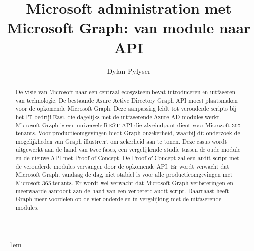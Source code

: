 \documentclass{hogent-article}
\title{Microsoft administration met Microsoft Graph: van module naar API}
\author{Dylan Pylyser}
\begin{document}
\begin{abstract} %
De visie van Microsoft naar een centraal ecosysteem bevat introduceren en uitfaseren van technologie. De bestaande Azure Active Directory Graph API moest plaatsmaken voor de opkomende Microsoft Graph. Deze aanpassing leidt tot verouderde scripts bij het IT-bedrijf Easi, die dagelijks met de uitfaserende Azure AD modules werkt. Microsoft Graph is een universele REST API die als eindpunt dient voor Microsoft 365 tenants. Voor productieomgevingen biedt Graph onzekerheid, waarbij dit onderzoek de mogelijkheden van Graph illustreert om zekerheid aan te tonen. Deze casus wordt uitgewerkt aan de hand van twee fases, een vergelijkende studie tussen de oude module en de nieuwe API met Proof-of-Concept. De Proof-of-Concept zal een audit-script met de verouderde modules vervangen door de opkomende API. Er wordt verwacht dat Microsoft Graph, vandaag de dag, niet stabiel is voor alle productieomgevingen met Microsoft 365 tenants. Er wordt wel verwacht dat Microsoft Graph verbeteringen en meerwaarde aantoont aan de hand van een verbeterd audit-script. Daarnaast heeft Graph meer voordelen op de vier onderdelen in vergelijking met de uitfaserende modules.
\end{abstract}

\tableofcontents



\emergencystretch=1em

\printbibliography[heading=bibintoc]
\end{document}
